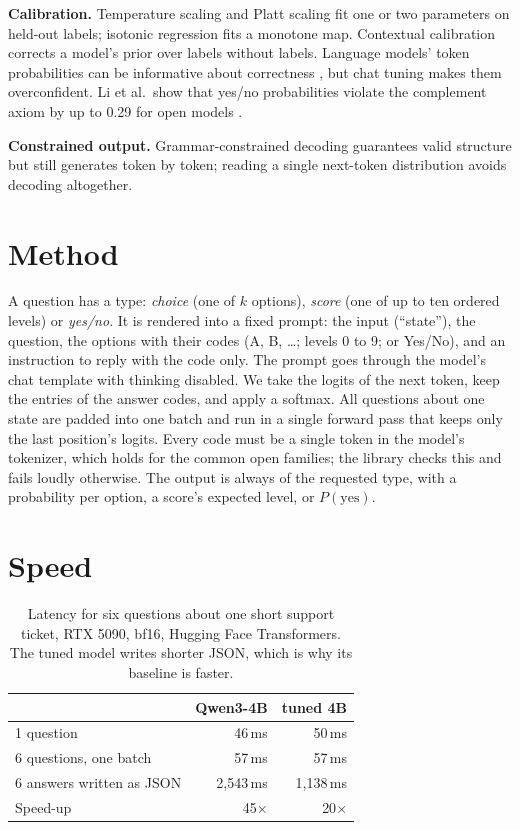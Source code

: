\documentclass[10pt,twocolumn]{article}
\begin{document}
\textbf{Calibration.} Temperature scaling \cite{guo} and Platt scaling \cite{platt} fit one or two parameters on
held-out labels; isotonic regression \cite{zadrozny} fits a monotone map. Contextual calibration \cite{zhao}
corrects a model's prior over labels without labels. Language models' token probabilities can be informative about
correctness \cite{kadavath}, but chat tuning makes them overconfident. Li et al.\ show that yes/no probabilities
violate the complement axiom by up to 0.29 for open models \cite{complement}.

\textbf{Constrained output.} Grammar-constrained decoding guarantees valid structure \cite{outlines} but still
generates token by token; reading a single next-token distribution avoids decoding altogether.

\section{Method}

A question has a type: \emph{choice} (one of $k$ options), \emph{score} (one of up to ten ordered levels) or
\emph{yes/no}. It is rendered into a fixed prompt: the input (``state''), the question, the options with their codes
(A, B, \dots; levels 0 to 9; or Yes/No), and an instruction to reply with the code only. The prompt goes through the
model's chat template with thinking disabled. We take the logits of the next token, keep the entries of the answer
codes, and apply a softmax. All questions about one state are padded into one batch and run in a single forward pass
that keeps only the last position's logits. Every code must be a single token in the model's tokenizer, which holds
for the common open families; the library checks this and fails loudly otherwise. The output is always of the
requested type, with a probability per option, a score's expected level, or $P(\text{yes})$.

\section{Speed}

\begin{table}[t]
\centering\small
\begin{tabular}{lrr}
\toprule
 & Qwen3-4B & tuned 4B \\
\midrule
1 question & 46\,ms & 50\,ms \\
6 questions, one batch & 57\,ms & 57\,ms \\
6 answers written as JSON & 2{,}543\,ms & 1{,}138\,ms \\
\midrule
Speed-up & 45$\times$ & 20$\times$ \\
\bottomrule
\end{tabular}
\caption{Latency for six questions about one short support ticket, RTX 5090, bf16, Hugging Face Transformers.
The tuned model writes shorter JSON, which is why its baseline is faster.}
\label{tab:speed}
\end{table}
\end{document}

